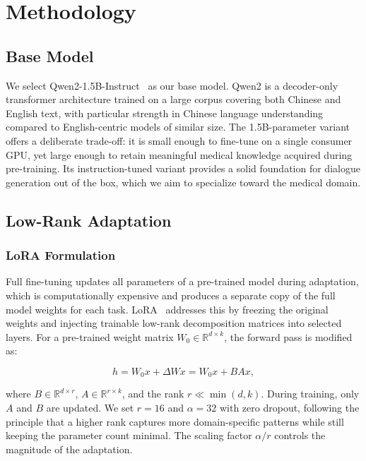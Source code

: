 \documentclass[11pt,a4paper]{article}
\begin{document}
\section{Methodology}
\label{sec:method}

\subsection{Base Model}

We select Qwen2-1.5B-Instruct~\cite{yang2024qwen2} as our base model. Qwen2 is a decoder-only transformer architecture trained on a large corpus covering both Chinese and English text, with particular strength in Chinese language understanding compared to English-centric models of similar size. The 1.5B-parameter variant offers a deliberate trade-off: it is small enough to fine-tune on a single consumer GPU, yet large enough to retain meaningful medical knowledge acquired during pre-training. Its instruction-tuned variant provides a solid foundation for dialogue generation out of the box, which we aim to specialize toward the medical domain.

\subsection{Low-Rank Adaptation}

\subsubsection{LoRA Formulation}

Full fine-tuning updates all parameters of a pre-trained model during adaptation, which is computationally expensive and produces a separate copy of the full model weights for each task. LoRA~\cite{hu2021lora} addresses this by freezing the original weights and injecting trainable low-rank decomposition matrices into selected layers. For a pre-trained weight matrix $W_0 \in \mathbb{R}^{d \times k}$, the forward pass is modified as:

\begin{equation}
h = W_0 x + \Delta W x = W_0 x + BAx,
\end{equation}

where $B \in \mathbb{R}^{d \times r}$, $A \in \mathbb{R}^{r \times k}$, and the rank $r \ll \min(d, k)$. During training, only $A$ and $B$ are updated. We set $r = 16$ and $\alpha = 32$ with zero dropout, following the principle that a higher rank captures more domain-specific patterns while still keeping the parameter count minimal. The scaling factor $\alpha / r$ controls the magnitude of the adaptation.
\end{document}
